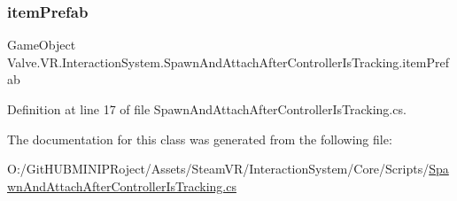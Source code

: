 \subsubsection{\texorpdfstring{itemPrefab}{itemPrefab}}
{\footnotesize\ttfamily Game\+Object Valve.\+V\+R.\+Interaction\+System.\+Spawn\+And\+Attach\+After\+Controller\+Is\+Tracking.\+item\+Prefab}



Definition at line 17 of file Spawn\+And\+Attach\+After\+Controller\+Is\+Tracking.\+cs.



The documentation for this class was generated from the following file\+:\begin{DoxyCompactItemize}
\item 
O\+:/\+Git\+H\+U\+B\+M\+I\+N\+I\+P\+Roject/\+Assets/\+Steam\+V\+R/\+Interaction\+System/\+Core/\+Scripts/\mbox{\hyperlink{_spawn_and_attach_after_controller_is_tracking_8cs}{Spawn\+And\+Attach\+After\+Controller\+Is\+Tracking.\+cs}}\end{DoxyCompactItemize}

